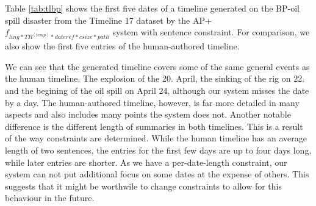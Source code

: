 \documentclass[a4paper,BCOR=10mm]{report}
\numberwithin{lemma}{chapter}
\numberwithin{definition}{chapter}
\begin{document}

Table \ref{tab:tlbp} shows the first five dates of a timeline generated on the BP-oil spill disaster from the Timeline 17 dataset by the AP+$f_{ ling*TR^{(temp)}*\mathit{dateref}*\mathit{csize}*\mathit{path} }$ system with sentence constraint.
For comparison, we also show the first five entries of the human-authored timeline.

We can see that the generated timeline covers some of the same general events as the human timeline.
The explosion of the 20. April, the sinking of the rig on 22. and the begining of the oil spill on April 24, although our system misses the date by a day. The human-authored timeline, however, is far more detailed in many aspects and also includes many points the system does not.
Another notable difference is the different length of summaries in both timelines. This is a result of the way constraints are determined. While the human timeline has an average length of two sentences, the entries for the first few days are up to four days long, while later entries are shorter.
As we have a per-date-length constraint, our system can not put additional focus on some dates at the expense of others. This suggests that it might be worthwile to change constraints to allow for this behaviour in the future.
\end{document}
